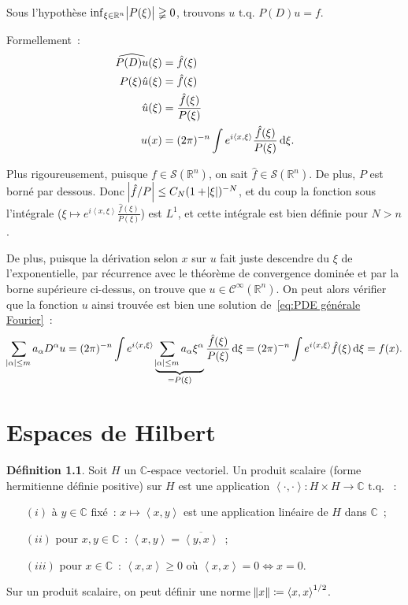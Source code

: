 \documentclass{report}
\newcommand{\C}{{\mathbb C}}
\newcommand{\R}{{\mathbb R}}
\newcommand{\scpr}[2]{\left\langle#1, #2\right\rangle}
\newcommand{\tq}{\text{ t.q. }}
\theoremstyle{definition}
\newtheorem{déf}[thm]{Définition}
\theoremstyle{remark}
\begin{document}
Sous l'hypothèse $\inf_{\xi \in \R^n}\abs {P(\xi)} \gneqq 0$, trouvons $u \tq P(D)u = f$.

Formellement~:
\begin{align*}
	\widehat {P(D)u}(\xi) &= \hat f(\xi) \\
	P(\xi)\hat u(\xi) &= \hat f(\xi) \\
	\hat u(\xi) &= \frac {\hat f(\xi)}{P(\xi)} \\
	u(x) &= (2\pi)^{-n}\int e^{i\scpr x\xi}\frac {\hat f(\xi)}{P(\xi)}\dif\xi.
\end{align*}

Plus rigoureusement, puisque $f \in \mathcal S(\R^n)$, on sait $\hat f \in \mathcal S(\R^n)$. De plus, $P$ est borné par dessous. Donc $\abs {\hat f/P} \leq C_N(1+\abs \xi)^{-N}$,
et du coup la fonction sous l'intégrale ($\xi  \mapsto e^{i\scpr x\xi}\frac {\hat f(\xi)}{P(\xi)}$) est $L^1$, et cette intégrale est bien définie pour $N > n$.

De plus, puisque la dérivation selon $x$ sur $u$ fait juste descendre du $\xi$ de l'exponentielle, par récurrence avec le théorème de convergence dominée et par la borne supérieure
ci-dessus, on trouve que $u \in \mathcal C^\infty(\R^n)$. On peut alors vérifier que la fonction $u$ ainsi trouvée est bien une solution de~\eqref{eq:PDE générale Fourier}~:
\[\sum_{\abs \alpha \leq m}a_\alpha D^\alpha u = (2\pi)^{-n}\int e^{i\scpr x\xi}\underbrace {\sum_{\abs \alpha \leq m}a_\alpha \xi^\alpha}_{=P(\xi)} \frac {\hat f(\xi)}{P(\xi)}\dif\xi
	= (2\pi)^{-n} \int e^{i\scpr x\xi}\hat f(\xi)\dif\xi = f(x).\]

\chapter{Espaces de Hilbert}

\begin{déf} Soit $H$ un $\C$-espace vectoriel. Un produit scalaire (forme hermitienne définie positive) sur $H$ est une application $\scpr \cdot\cdot : H \times H \to \C \tq$~:
\begin{itemize}
	\item[$(i)$]   à $y \in \C$ fixé~: $x \mapsto \scpr xy$ est une application linéaire de $H$ dans $\C$~;
	\item[$(ii)$]  pour $x, y \in \C$~: $\scpr xy = \overline {\scpr yx}$~;
	\item[$(iii)$] pour $x \in \C$~: $\scpr xx \geq 0$ où $\scpr xx = 0 \iff x = 0$.
\end{itemize}

Sur un produit scalaire, on peut définir une norme $\norm x \coloneqq \scpr xx^{1/2}$.
\end{déf}
\end{document}
